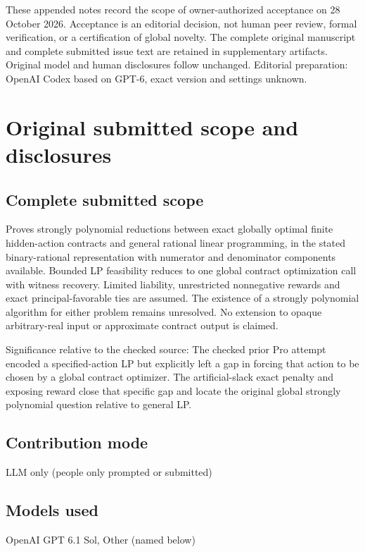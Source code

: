 \documentclass[11pt]{article}
\begin{document}
These appended notes record the scope of owner-authorized acceptance on 28 October 2026. Acceptance is an editorial decision, not human peer review, formal verification, or a certification of global novelty. The complete original manuscript and complete submitted issue text are retained in supplementary artifacts. Original model and human disclosures follow unchanged. Editorial preparation: OpenAI Codex based on GPT-6, exact version and settings unknown.

\section{Original submitted scope and disclosures}

\subsection{Complete submitted scope}

Proves strongly polynomial reductions between exact globally optimal finite hidden-action contracts and general rational linear programming, in the stated binary-rational representation with numerator and denominator components available. Bounded LP feasibility reduces to one global contract optimization call with witness recovery. Limited liability, unrestricted nonnegative rewards and exact principal-favorable ties are assumed. The existence of a strongly polynomial algorithm for either problem remains unresolved. No extension to opaque arbitrary-real input or approximate contract output is claimed.

Significance relative to the checked source: The checked prior Pro attempt encoded a specified-action LP but explicitly left a gap in forcing that action to be chosen by a global contract optimizer. The artificial-slack exact penalty and exposing reward close that specific gap and locate the original global strongly polynomial question relative to general LP.

\subsection{Contribution mode}

LLM only (people only prompted or submitted)

\subsection{Models used}

OpenAI GPT 6.1 Sol, Other (named below)
\end{document}
